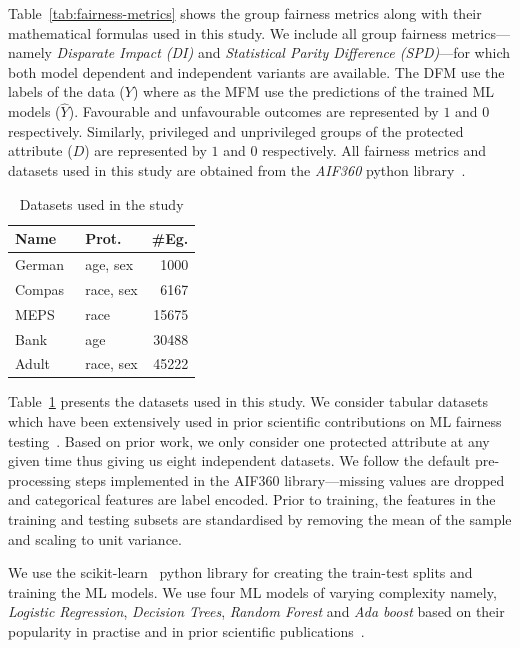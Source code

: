 \documentclass{article}
\begin{document}
Table \ref{tab:fairness-metrics} shows the group fairness metrics
along with their mathematical formulas used in this study. We include
all group fairness metrics---namely \emph{Disparate Impact (DI)} and
\emph{Statistical Parity Difference (SPD)}---for which both model
dependent and independent variants are available. The DFM use the
labels of the data ($Y$) where as the MFM use the predictions of the
trained ML models ($\hat{Y}$). Favourable and unfavourable outcomes
are represented by $1$ and $0$ respectively. Similarly, privileged and
unprivileged groups of the protected attribute ($D$) are represented
by $1$ and $0$ respectively. All fairness metrics and datasets used in
this study are obtained from the \emph{AIF360} python
library \cite{bellamy2019ai}.

\begin{table}
  \centering
  \begin{tabular}{l l r}
    \toprule
    \textbf{Name} & \textbf{Prot.} & \textbf{\#Eg.}\\
    \midrule
    German \cite{hofmann1994german} & age, sex & 1000\\
    Compas\cite{angwin2016machine} & race, sex & 6167\\
    MEPS \cite{mepsdata} & race & 15675\\
    Bank\cite{moro2014data} & age & 30488\\
    Adult\cite{kohavi1996scaling} & race, sex & 45222\\
    \bottomrule
  \end{tabular}
  \caption{Datasets used in the study}
  \label{tab:datasets}
\end{table}

Table \ref{tab:datasets} presents the datasets used in this study. We
consider tabular datasets which have been extensively used in prior
scientific contributions on ML fairness
testing \cite{zhang2021ignorance,biswas2020machine,biswas2021fair,chen2022fairness}. Based
on prior work, we only consider one protected attribute at any given
time thus giving us eight independent datasets. We follow the default
pre-processing steps implemented in the AIF360 library---missing
values are dropped and categorical features are label encoded. Prior
to training, the features in the training and testing subsets are
standardised by removing the mean of the sample and scaling to unit
variance.

We use the scikit-learn \cite{pedregosa2011scikit} python library for
creating the train-test splits and training the ML models. We use four
ML models of varying complexity namely, \emph{Logistic Regression},
\emph{Decision Trees}, \emph{Random Forest} and \emph{Ada boost} based
on their popularity in practise and in prior scientific
publications \cite{zhang2021ignorance,biswas2021fair,biswas2020machine}.
\end{document}
